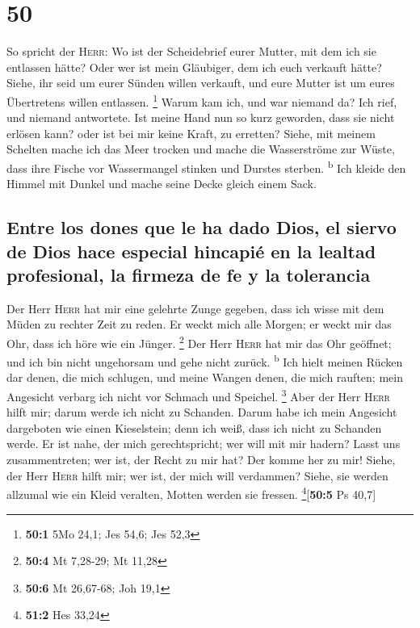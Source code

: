 \hypertarget{section-49}{%
\section{50}\label{section-49}}

 So spricht der \textsc{Herr}: Wo ist der Scheidebrief
eurer Mutter, mit dem ich sie entlassen hätte? Oder wer ist mein
Gläubiger, dem ich euch verkauft hätte? Siehe, ihr seid um eurer Sünden
willen verkauft, und eure Mutter ist um eures Übertretens willen
entlassen. \footnote{\textbf{50:1} 5Mo 24,1; Jes 54,6; Jes 52,3}
 Warum kam ich, und war niemand da? Ich rief, und niemand
antwortete. Ist meine Hand nun so kurz geworden, dass sie nicht erlösen
kann? oder ist bei mir keine Kraft, zu erretten? Siehe, mit meinem
Schelten mache ich das Meer trocken und mache die Wasserströme zur
Wüste, dass ihre Fische vor Wassermangel stinken und Durstes sterben.
\textsuperscript{b}  Ich kleide den Himmel mit Dunkel und
mache seine Decke gleich einem Sack.

\hypertarget{entre-los-dones-que-le-ha-dado-dios-el-siervo-de-dios-hace-especial-hincapiuxe9-en-la-lealtad-profesional-la-firmeza-de-fe-y-la-tolerancia}{%
\subsection{Entre los dones que le ha dado Dios, el siervo de Dios hace
especial hincapié en la lealtad profesional, la firmeza de fe y la
tolerancia}\label{entre-los-dones-que-le-ha-dado-dios-el-siervo-de-dios-hace-especial-hincapiuxe9-en-la-lealtad-profesional-la-firmeza-de-fe-y-la-tolerancia}}

 Der Herr \textsc{Herr} hat mir eine gelehrte Zunge
gegeben, dass ich wisse mit dem Müden zu rechter Zeit zu reden. Er weckt
mich alle Morgen; er weckt mir das Ohr, dass ich höre wie ein Jünger.
\footnote{\textbf{50:4} Mt 7,28-29; Mt 11,28}  Der Herr
\textsc{Herr} hat mir das Ohr geöffnet; und ich bin nicht ungehorsam und
gehe nicht zurück. \textsuperscript{b}  Ich hielt meinen
Rücken dar denen, die mich schlugen, und meine Wangen denen, die mich
rauften; mein Angesicht verbarg ich nicht vor Schmach und Speichel.
\footnote{\textbf{50:6} Mt 26,67-68; Joh 19,1}  Aber der
Herr \textsc{Herr} hilft mir; darum werde ich nicht zu Schanden. Darum
habe ich mein Angesicht dargeboten wie einen Kieselstein; denn ich weiß,
dass ich nicht zu Schanden werde.  Er ist nahe, der mich
gerechtspricht; wer will mit mir hadern? Lasst uns zusammentreten; wer
ist, der Recht zu mir hat? Der komme her zu mir!  Siehe,
der Herr \textsc{Herr} hilft mir; wer ist, der mich will verdammen?
Siehe, sie werden allzumal wie ein Kleid veralten, Motten werden sie
fressen. \footnote{\textbf{51:2} Hes 33,24}{[}\textbf{50:5} Ps 40,7{]}

